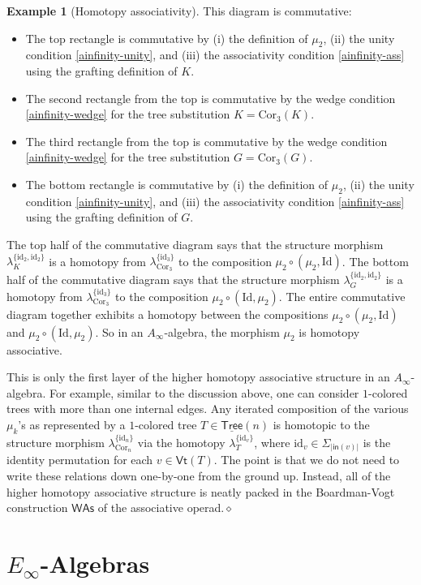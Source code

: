 \documentclass{amsbook}
\numberwithin{section}{chapter}
\numberwithin{subsection}{section}
\numberwithin{equation}{section}
\theoremstyle{plain}
\theoremstyle{definition}
\newtheorem{example}[equation]{Example}
\newcommand{\Cor}{\mathrm{Cor}}
\newcommand{\Vt}{\mathsf{Vt}}
\newcommand{\W}{\mathsf{W}}
\newcommand{\Id}{\mathrm{Id}}
\newcommand{\id}{\mathrm{id}}
\newcommand{\dqed}{\hfill$\diamond$}
\newcommand{\As}{\mathsf{As}}
\newcommand{\Was}{\W\As}
\newcommand{\Tree}{\mathsf{Tree}}
\newcommand{\uTree}{\underline{\Tree}}
\newcommand{\inp}{\mathsf{in}}
\begin{document}
\begin{example}[Homotopy associativity]
This diagram is commutative:
\begin{itemize}
\item The top rectangle is commutative by (i) the definition of $\mu_2$, (ii) the unity condition \eqref{ainfinity-unity}, and (iii) the associativity condition \eqref{ainfinity-ass} using the grafting definition of $K$.
\item The second rectangle from the top is commutative by the wedge condition \eqref{ainfinity-wedge} for the tree substitution $K=\Cor_3(K)$.
\item The third rectangle from the top is commutative by the wedge condition \eqref{ainfinity-wedge} for the tree substitution $G=\Cor_3(G)$.
\item The bottom rectangle is commutative by (i) the definition of $\mu_2$, (ii) the unity condition \eqref{ainfinity-unity}, and (iii) the associativity condition \eqref{ainfinity-ass} using the grafting definition of $G$.
\end{itemize}
The top half of the commutative diagram says that the structure morphism $\lambda_K^{\{\id_2,\id_2\}}$ is a homotopy from $\lambda_{\Cor_3}^{\{\id_3\}}$ to the composition $\mu_2\circ(\mu_2,\Id)$.  The bottom half of the commutative diagram says that the structure morphism $\lambda_G^{\{\id_2,\id_2\}}$ is a homotopy from $\lambda_{\Cor_3}^{\{\id_3\}}$ to the composition $\mu_2\circ(\Id,\mu_2)$.  The entire commutative diagram together exhibits a homotopy between the compositions $\mu_2\circ(\mu_2,\Id)$ and $\mu_2\circ(\Id,\mu_2)$.  So in an $A_\infty$-algebra, the morphism $\mu_2$ is homotopy associative.  

This is only the first layer of the higher homotopy associative structure in an $A_\infty$-algebra.  For example, similar to the discussion above, one can consider $1$-colored trees with more than one internal edges.  Any iterated composition of the various $\mu_k$'s as represented by a $1$-colored tree $T \in \uTree(n)$ is homotopic to the structure morphism $\lambda_{\Cor_n}^{\{\id_n\}}$ via the homotopy $\lambda_T^{\{\id_v\}}$, where $\id_v\in \Sigma_{|\inp(v)|}$ is the identity permutation for each $v \in \Vt(T)$.  The point is that we do not need to write these relations down one-by-one from the ground up.  Instead, all of the higher homotopy associative structure is neatly packed in the Boardman-Vogt construction $\Was$ of the associative operad.\dqed
\end{example}


\section{$E_\infty$-Algebras}\label{sec:einfinity-algebra}
\end{document}
